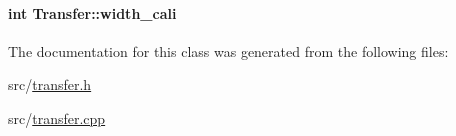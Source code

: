 \hypertarget{classTransfer_ad0a21f131888045697ccbbe5ff2d127e}{
\paragraph[{width\-\_\-cali}]{\setlength{\rightskip}{0pt plus 5cm}int {\bf \-Transfer\-::width\-\_\-cali}}}\label{classTransfer_ad0a21f131888045697ccbbe5ff2d127e}


\-The documentation for this class was generated from the following files\-:\begin{DoxyCompactItemize}
\item 
src/\hyperlink{transfer_8h}{transfer.\-h}\item 
src/\hyperlink{transfer_8cpp}{transfer.\-cpp}\end{DoxyCompactItemize}
